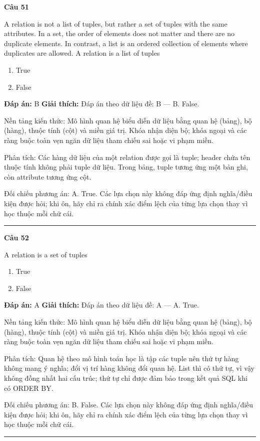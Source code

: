 \documentclass[11pt,a4paper]{article}
\newenvironment{question}[1]{%
  \par\vspace{1em}\noindent\textbf{\large Câu #1}\par\vspace{0.4em}
}{%
  \par\vspace{1em}\hrule\vspace{0.6em}
}
\newenvironment{choices}{%
  \begin{enumerate}[label=\textbf{\Alph*.},leftmargin=2.2em,itemsep=2pt,topsep=3pt]
}{%
  \end{enumerate}
}
\newcommand{\choice}{\item}
\begin{document}
\begin{question}{51}
A relation is not a list of tuples, but rather a set of tuples with the same attributes. In a set, the order of elements does not matter and there are no duplicate elements. In contrast, a list is an ordered collection of elements where duplicates are allowed.
A relation is a list of tuples
\begin{choices}
\choice True
\choice False
\end{choices}
\textbf{Đáp án:} B
\textbf{Giải thích:} Đáp án theo dữ liệu đề: B — B. False.

Nền tảng kiến thức: Mô hình quan hệ biểu diễn dữ liệu bằng quan hệ (bảng), bộ (hàng), thuộc tính (cột) và miền giá trị. Khóa nhận diện bộ; khóa ngoại và các ràng buộc toàn vẹn ngăn dữ liệu tham chiếu sai hoặc vi phạm miền.

Phân tích: Các hàng dữ liệu của một relation được gọi là tuple; header chứa tên thuộc tính không phải tuple dữ liệu. Trong bảng, tuple tương ứng một bản ghi, còn attribute tương ứng cột.

Đối chiếu phương án: A. True. Các lựa chọn này không đáp ứng định nghĩa/điều kiện được hỏi; khi ôn, hãy chỉ ra chính xác điểm lệch của từng lựa chọn thay vì học thuộc mỗi chữ cái.
\end{question}

\begin{question}{52}
A relation is a set of tuples
\begin{choices}
\choice True
\choice False
\end{choices}
\textbf{Đáp án:} A
\textbf{Giải thích:} Đáp án theo dữ liệu đề: A — A. True.

Nền tảng kiến thức: Mô hình quan hệ biểu diễn dữ liệu bằng quan hệ (bảng), bộ (hàng), thuộc tính (cột) và miền giá trị. Khóa nhận diện bộ; khóa ngoại và các ràng buộc toàn vẹn ngăn dữ liệu tham chiếu sai hoặc vi phạm miền.

Phân tích: Quan hệ theo mô hình toán học là tập các tuple nên thứ tự hàng không mang ý nghĩa; đổi vị trí hàng không đổi quan hệ. List thì có thứ tự, vì vậy không đồng nhất hai cấu trúc; thứ tự chỉ được đảm bảo trong kết quả SQL khi có ORDER BY.

Đối chiếu phương án: B. False. Các lựa chọn này không đáp ứng định nghĩa/điều kiện được hỏi; khi ôn, hãy chỉ ra chính xác điểm lệch của từng lựa chọn thay vì học thuộc mỗi chữ cái.
\end{question}
\end{document}
